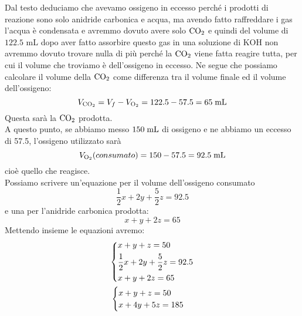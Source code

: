 \begin{soluzione}
    Dal testo deduciamo che avevamo ossigeno in eccesso perché i prodotti di reazione sono solo anidride carbonica e acqua, ma avendo fatto raffreddare i gas l'acqua è condensata e avremmo dovuto avere solo $\rm CO_2$ e quindi del volume di $122.5$ mL dopo aver fatto assorbire questo gas in una soluzione di KOH non avremmo dovuto trovare nulla di più perché la $\rm CO_2$ viene fatta reagire tutta, per cui il volume che troviamo è dell'ossigeno in eccesso. Ne segue che possiamo calcolare il volume della $\rm CO_2$ come differenza tra il volume finale ed il volume dell'ossigeno:
    \begin{equation*}
        V_{\rm CO_2}
        =V_f - V_{\rm O_2}
        =122.5 -57.5=65 \; \rm mL
    \end{equation*}
    Questa sarà la $\rm CO_2$ prodotta.\\
    A questo punto, se abbiamo messo $150 \; \rm mL$ di ossigeno e ne abbiamo un eccesso di 57.5, l'ossigeno utilizzato sarà
    \begin{equation*}
        V_{\rm O_2}(consumato)
        =150-57.5
        =92.5 \; \rm mL
    \end{equation*}
    cioè quello che reagisce.\\
    Possiamo scrivere un'equazione per il volume dell'ossigeno consumato
    \begin{equation*}
        \frac{1}{2}x + 2y + \frac{5}{2}z=92.5
    \end{equation*}
    e una per l'anidride carbonica prodotta:
    \begin{equation*}
        x+y+2z=65
    \end{equation*}
    Mettendo insieme le equazioni avremo:
    \begin{gather*}
        \begin{dcases}
            x+y+z=50\\
            \frac{1}{2}x + 2y + \frac{5}{2}z=92.5\\
            x + y + 2z=65
        \end{dcases}
        \\
        \begin{cases}
            x+y+z=50\\
            x + 4y + 5z=185\\

\end{cases}
\end{gather*}
\end{soluzione}
